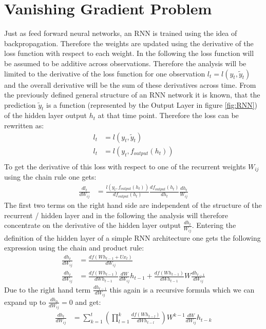 \section{Vanishing Gradient Problem}
Just as feed forward neural networks, an RNN is trained using the idea of backpropagation. Therefore the weights are updated using the derivative of the loss function with respect to each weight. In the following the loss function will be assumed to be additive across observations. Therefore the analysis will be limited to the derivative of the loss function for one observation $l_t = l(y_t, \tilde{y}_t)$ and the overall derivative will be the sum of these derivatives across time. From the previously defined general structure of an RNN network it is known, that the prediction $\tilde{y}_t$ is a function (represented by the Output Layer in  figure \ref{fig:RNN}) of the hidden layer output $h_t$ at that time point. Therefore the loss can be rewritten as:
\begin{align*}
l_t &= l(y_t, \tilde{y}_t) \\
l_t &= l(y_t, f_{output}(h_t))\\
\end{align*}
To get the derivative of this loss with respect to one of the recurrent weights $W_{ij}$ using the chain rule one gets:
\begin{align*}
\frac{dl_t}{dW_{ij}} &= \frac{l(y_t, f_{output}(h_t))}{df_{output}(h_t)}\frac{df_{output}(h_t)}{dh_t}\frac{dh_t}{W_{ij}}
\end{align*}
The first two terms on the right hand side are independent of the structure of the recurrent / hidden layer and in the following the analysis will therefore concentrate on the derivative of the hidden layer output $\frac{dh_t}{W_{ij}}$.
Entering the definition of the hidden layer of a simple RNN architecture one gets the following expression using the chain and product rule:
\begin{align*}
\frac{dh_t}{dW_{ij}} &= \frac{df(Wh_{t-1} + Ux_t)}{dW_{ij}} \\
\frac{dh_t}{dW_{ij}} &= \frac{df(Wh_{t-1})}{dWh_{t-1}}\frac{dW}{dW_{ij}}h_{t-1} +\frac{df(Wh_{t-1})}{dWh_{t-1}} W\frac{dh_{t-1}}{dW_{ij}}
\end{align*}
Due to the right hand term $\frac{dh_{t-1}}{dW_{ij}}$ this again is a recursive formula which we can expand up to $ \frac{dh_{0}}{dW_{ij}} = 0$ and get:
\begin{align*}
\frac{dh_t}{dW_{ij}} &= \sum_{k = 1}^t( \prod_{l = 1}^k \frac{df(Wh_{t-l})}{dWh_{t-l}}) W^{k-1} \frac{dW}{dW_{ij}} h_{t-k}
\end{align*}
